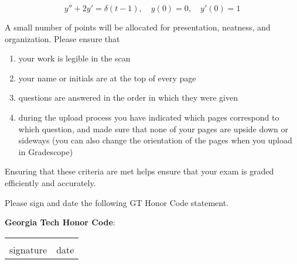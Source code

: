 \documentclass[12pt]{exam}
\begin{document}
\begin{questions}
    $$y'' + 2y' = \delta(t-1), \quad y(0) = 0, \quad y'(0) = 1$$ %



\newpage \Initials
    

    \question[2] A small number of points will be allocated for presentation, neatness, and organization. Please ensure that
    \begin{enumerate}
        \item your work is legible in the scan
        \item your name or initials are at the top of every page
        \item questions are answered in the order in which they were given
        \item during the upload process you have indicated which pages correspond to which question, and made sure that none of your pages are upside down or sideways (you can also change the orientation of the pages when you upload in Gradescope)
    \end{enumerate}
    Ensuring that these criteria are met helps ensure that your exam is graded efficiently and accurately. 
    


    
\end{questions}
    
    Please sign and date the following GT Honor Code statement. \\ 
    \vspace{2pt}
    
    \textbf{Georgia Tech Honor Code}:\ \GTHonorCode
    
    \begin{center}
    \begin{center}
        \def\arraystretch{0.35}%
        \begin{tabular}{ b{8cm} b{8cm} }
        \vspace{.5cm} \underline{\hspace{7cm}} & \vspace{.5cm} \underline{\hspace{4.5cm}}  \tabularnewline
        \vspace{6pt} signature & \vspace{6pt} date    
        \end{tabular}
    \end{center}
    \end{center}    
\end{document}
